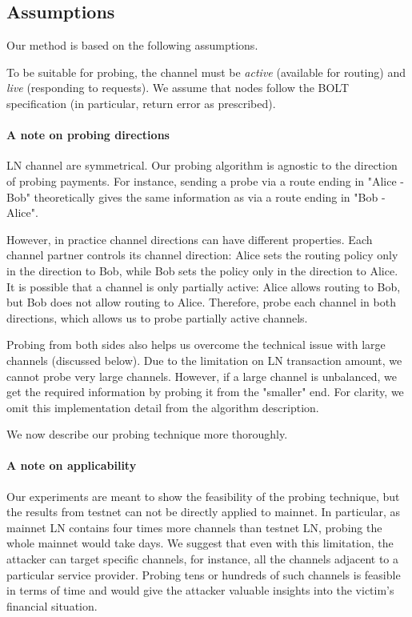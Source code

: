 \subsection{Assumptions}

Our method is based on the following assumptions.

To be suitable for probing, the channel must be \textit{active} (available for routing) and \textit{live} (responding to requests).
We assume that nodes follow the BOLT specification (in particular, return error as prescribed).

\paragraph{A note on probing directions}

LN channel are symmetrical.
Our probing algorithm is agnostic to the direction of probing payments.
For instance, sending a probe via a route ending in "Alice - Bob" theoretically gives the same information as via a route ending in "Bob - Alice".

However, in practice channel directions can have different properties.
Each channel partner controls its channel direction: Alice sets the routing policy only in the direction to Bob, while Bob sets the policy only in the direction to Alice.
It is possible that a channel is only partially active: Alice allows routing to Bob, but Bob does not allow routing to Alice.
Therefore, probe each channel in both directions, which allows us to probe partially active channels.

Probing from both sides also helps us overcome the technical issue with large channels (discussed below).
Due to the limitation on LN transaction amount, we cannot probe very large channels.
However, if a large channel is unbalanced, we get the required information by probing it from the "smaller" end.
For clarity, we omit this implementation detail from the algorithm description.

We now describe our probing technique more thoroughly.

\paragraph{A note on applicability}

Our experiments are meant to show the feasibility of the probing technique, but the results from testnet can not be directly applied to mainnet.
In particular, as mainnet LN contains four times more channels than testnet LN, probing the whole mainnet would take days.
We suggest that even with this limitation, the attacker can target specific channels, for instance, all the channels adjacent to a particular service provider.
Probing tens or hundreds of such channels is feasible in terms of time and would give the attacker valuable insights into the victim's financial situation.


